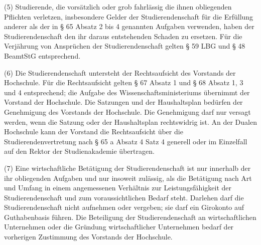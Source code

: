 \documentclass[
10pt,
a4paper,
twoside,								%
titlepage=false,							%
draft=false								%
]{scrartcl}
\begin{document}
(5) Studierende, die vorsätzlich oder grob  fahrlässig die ihnen obliegenden Pflichten verletzen, insbesondere  Gelder der Studierendenschaft für die Erfüllung anderer als der in § 65  Absatz 2 bis 4 genannten Aufgaben verwenden, haben der  Studierendenschaft den ihr daraus entstehenden Schaden zu ersetzen. Für  die Verjährung von Ansprüchen der Studierendenschaft gelten § 59  LBG und § 48  BeamtStG entsprechend.

(6) Die Studierendenschaft untersteht der  Rechtsaufsicht des Vorstands der Hochschule. Für die Rechtsaufsicht  gelten § 67 Absatz 1 und § 68 Absatz 1, 3 und 4 entsprechend; die  Aufgabe des Wissenschaftsministeriums übernimmt der Vorstand der  Hochschule. Die Satzungen und der Haushaltsplan bedürfen der Genehmigung  des Vorstands der Hochschule. Die Genehmigung darf nur versagt werden,  wenn die Satzung oder der Haushaltsplan rechtswidrig ist. An der Dualen  Hochschule kann der Vorstand die Rechtsaufsicht über die  Studierendenvertretung nach § 65 a Absatz 4 Satz 4 generell oder im  Einzelfall auf den Rektor der Studienakademie übertragen.

(7) Eine wirtschaftliche Betätigung der  Studierendenschaft ist nur innerhalb der ihr obliegenden Aufgaben und  nur insoweit zulässig, als die Betätigung nach Art und Umfang in einem  angemessenen Verhältnis zur Leistungsfähigkeit der Studierendenschaft  und zum voraussichtlichen Bedarf steht. Darlehen darf die  Studierendenschaft nicht aufnehmen oder vergeben; sie darf ein Girokonto  auf Guthabenbasis führen. Die Beteiligung der Studierendenschaft an  wirtschaftlichen Unternehmen oder die Gründung wirtschaftlicher  Unternehmen bedarf der vorherigen Zustimmung des Vorstands der  Hochschule.
\end{document}
